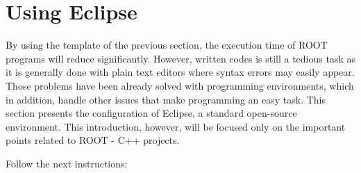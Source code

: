 \documentclass[12pt, oneside]{book}              %
\begin{document}
\section{Using Eclipse}\label{sec:Eclipse}

By using the template of the previous section, the execution time of ROOT programs
will reduce significantly. However, written codes is still a tedious task as
it is generally done with plain text editors where syntax errors may easily appear.
Those problems have been already solved with programming environments, which
in addition, handle other issues that make programming an easy task. This section 
presents the configuration of Eclipse, a standard open-source environment.
This introduction, however, will be focused only on the important points related to
ROOT - C++ projects.

Follow the next instructions:
\end{document}
